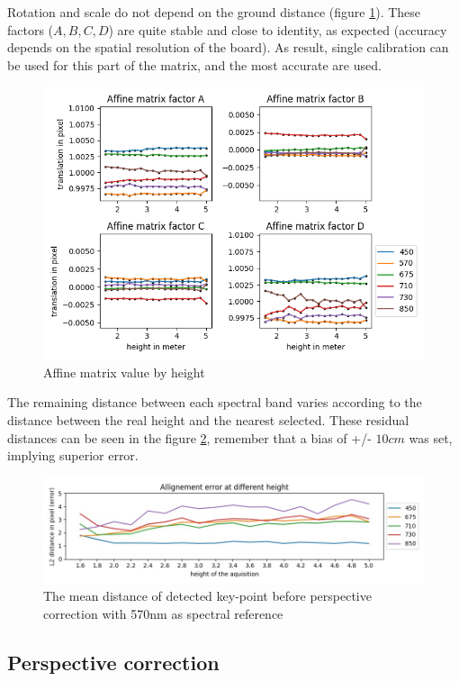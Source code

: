 \documentclass[]{elsarticle}
\begin{document}
	Rotation and scale do not depend on the ground distance (figure \ref{fig:affine-rotation-height}).
	These factors ($A,B,C,D$) are quite stable and close to identity, as expected (accuracy depends on the spatial resolution of the board).
	As result, single calibration can be used for this part of the matrix, and the most accurate are used.
	
	\begin{figure}[H]
		\centering
		\includegraphics[width=0.5\linewidth]{../figures/affine-rotation-height.png}
		\caption{Affine matrix value by height}
		\label{fig:affine-rotation-height}
	\end{figure}
	
	The remaining distance between each spectral band varies according to the distance between the real height and the nearest selected.
	These residual distances can be seen in the figure \ref{fig:affine-error},
	remember that a bias of +/- $10cm$ was set, implying superior error.
	
	\begin{figure}[H]
	\centering
		\includegraphics[width=0.8\linewidth]{../figures/affine-allignement-rmse.jpg}
		\caption{The mean distance of detected key-point before perspective correction with 570nm as spectral reference}
		\label{fig:affine-error}
	\end{figure}
	
	
	\subsection{Perspective correction}
	
\end{document}
